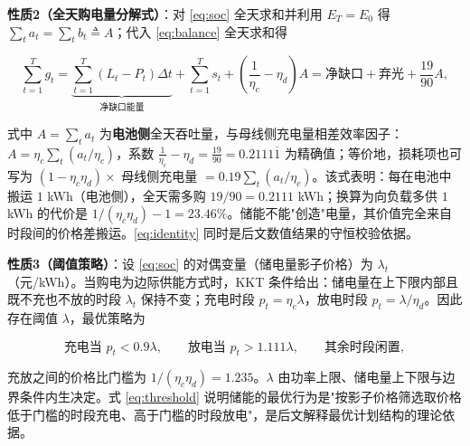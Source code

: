 \textbf{性质2（全天购电量分解式）}：对 \cref{eq:soc} 全天求和并利用 $E_T=E_0$ 得 $\sum_t a_t=\sum_t b_t\triangleq A$；代入 \cref{eq:balance} 全天求和得

\begin{equation}
  \sum_{t=1}^{T} g_t=\underbrace{\sum_{t=1}^{T}(L_t-P_t)\Delta t}_{\text{净缺口能量}}
  +\sum_{t=1}^{T} s_t+\left(\frac{1}{\eta_c}-\eta_d\right)A
  =\text{净缺口}+\text{弃光}+\frac{19}{90}A ,
  \label{eq:identity}
\end{equation}

式中 $A=\sum_t a_t$ 为\textbf{电池侧}全天吞吐量，与母线侧充电量相差效率因子：$A=\eta_c\sum_t(a_t/\eta_c)$，系数 $\frac{1}{\eta_c}-\eta_d=\frac{19}{90}=0.2111\overline{1}$ 为精确值；等价地，损耗项也可写为 $(1-\eta_c\eta_d)\times$ 母线侧充电量 $=0.19\sum_t(a_t/\eta_c)$。该式表明：每在电池中搬运 $1$ \si{kWh}（电池侧），全天需多购 $19/90=0.2111$ \si{kWh}；换算为向负载多供 $1$ \si{kWh} 的代价是 $1/(\eta_c\eta_d)-1=23.46\%$。储能不能"创造"电量，其价值完全来自时段间的价格差搬运。\cref{eq:identity} 同时是后文数值结果的守恒校验依据。

\textbf{性质3（阈值策略）}：设 \cref{eq:soc} 的对偶变量（储电量影子价格）为 $\lambda_t$（元/kWh）。当购电为边际供能方式时，KKT 条件\cite{dantzig1963}给出：储电量在上下限内部且既不充也不放的时段 $\lambda_t$ 保持不变；充电时段 $p_t=\eta_c\lambda$，放电时段 $p_t=\lambda/\eta_d$。因此存在阈值 $\lambda$，最优策略为

\begin{equation}
  \text{充电当 }p_t<0.9\lambda,\qquad \text{放电当 }p_t>1.111\lambda,\qquad \text{其余时段闲置},
  \label{eq:threshold}
\end{equation}

充放之间的价格比门槛为 $1/(\eta_c\eta_d)=1.235$。$\lambda$ 由功率上限、储电量上下限与边界条件内生决定。式 \eqref{eq:threshold} 说明储能的最优行为是"按影子价格筛选取价格低于门槛的时段充电、高于门槛的时段放电"，是后文解释最优计划结构的理论依据。
